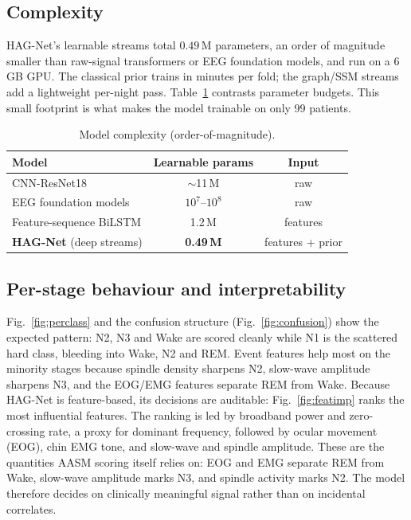 \documentclass[journal]{IEEEtran}
\begin{document}
\subsection{Complexity}
HAG-Net's learnable streams total $0.49$\,M parameters, an order of magnitude
smaller than raw-signal transformers or EEG foundation models, and run on a 6\,GB
GPU. The classical prior trains in minutes per fold; the graph/SSM streams add a
lightweight per-night pass. Table~\ref{tab:complexity} contrasts parameter budgets.
This small footprint is what makes the model trainable on only 99 patients.

\begin{table}[t]
\caption{Model complexity (order-of-magnitude).}
\label{tab:complexity}
\centering
\setlength{\tabcolsep}{4pt}
\begin{tabular}{lcc}
\toprule
Model & Learnable params & Input \\
\midrule
CNN-ResNet18~\cite{maiti2026isleeps} & $\sim$11\,M & raw \\
EEG foundation models~\cite{labram2024,cbramod2025} & $10^{7}$--$10^{8}$ & raw \\
Feature-sequence BiLSTM & 1.2\,M & features \\
\textbf{HAG-Net} (deep streams) & \textbf{0.49\,M} & features + prior \\
\bottomrule
\end{tabular}
\end{table}

\subsection{Per-stage behaviour and interpretability}
Fig.~\ref{fig:perclass} and the confusion structure (Fig.~\ref{fig:confusion})
show the expected pattern: N2, N3 and Wake are scored cleanly while N1 is the
scattered hard class, bleeding into Wake, N2 and REM. Event features help most on
the minority stages because spindle density sharpens N2, slow-wave amplitude
sharpens N3, and the EOG/EMG features separate REM from Wake. Because HAG-Net is
feature-based, its decisions are auditable: Fig.~\ref{fig:featimp} ranks the most
influential features. The ranking is led by broadband power and zero-crossing rate,
a proxy for dominant frequency, followed by ocular movement (EOG), chin EMG tone,
and slow-wave and spindle amplitude. These are the quantities AASM scoring itself
relies on: EOG and EMG separate REM from Wake, slow-wave amplitude marks N3, and
spindle activity marks N2. The model therefore decides on clinically meaningful
signal rather than on incidental correlates.
\end{document}
